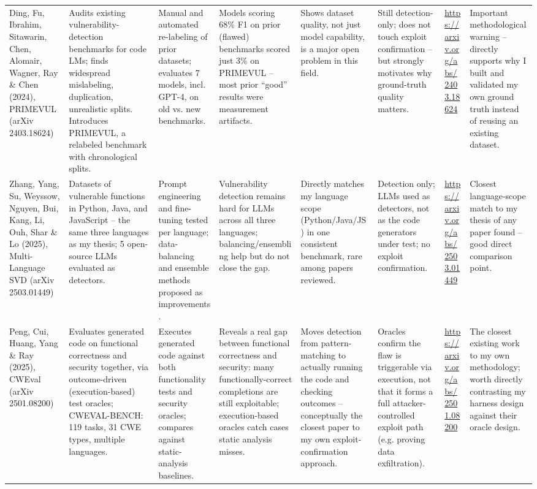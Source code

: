 \documentclass[10pt]{article}
\begin{document}
\begin{landscape}
\begin{longtable}{
  P{2.6cm}
  P{3.6cm}
  P{3.2cm}
  P{4.0cm}
  P{3.0cm}
  P{3.0cm}
  P{2.2cm}
  P{3.6cm}
}
Ding, Fu, Ibrahim, Sitawarin, Chen, Alomair, Wagner, Ray \& Chen (2024), PRIMEVUL (arXiv 2403.18624)
&
Audits existing vulnerability-detection benchmarks for code LMs; finds widespread mislabeling, duplication, unrealistic splits. Introduces PRIMEVUL, a relabeled benchmark with chronological splits.
&
Manual and automated re-labeling of prior datasets; evaluates 7 models, incl. GPT-4, on old vs. new benchmarks.
&
Models scoring 68\% F1 on prior (flawed) benchmarks scored just 3\% on PRIMEVUL -- most prior ``good'' results were measurement artifacts.
&
Shows dataset quality, not just model capability, is a major open problem in this field.
&
Still detection-only; does not touch exploit confirmation -- but strongly motivates why ground-truth quality matters.
&
\url{https://arxiv.org/abs/2403.18624}
&
Important methodological warning -- directly supports why I built and validated my own ground truth instead of reusing an existing dataset.
\\[4pt]

Zhang, Yang, Su, Weyssow, Nguyen, Bui, Kang, Li, Ouh, Shar \& Lo (2025), Multi-Language SVD (arXiv 2503.01449)
&
Datasets of vulnerable functions in Python, Java, and JavaScript -- the same three languages as my thesis; 5 open-source LLMs evaluated as detectors.
&
Prompt engineering and fine-tuning tested per language; data-balancing and ensemble methods proposed as improvements.
&
Vulnerability detection remains hard for LLMs across all three languages; balancing/ensembling help but do not close the gap.
&
Directly matches my language scope (Python/Java/JS) in one consistent benchmark, rare among papers reviewed.
&
Detection only; LLMs used as detectors, not as the code generators under test; no exploit confirmation.
&
\url{https://arxiv.org/abs/2503.01449}
&
Closest language-scope match to my thesis of any paper found -- good direct comparison point.
\\[4pt]

Peng, Cui, Huang, Yang \& Ray (2025), CWEval (arXiv 2501.08200)
&
Evaluates generated code on functional correctness and security together, via outcome-driven (execution-based) test oracles; CWEVAL-BENCH: 119 tasks, 31 CWE types, multiple languages.
&
Executes generated code against both functionality tests and security oracles; compares against static-analysis baselines.
&
Reveals a real gap between functional correctness and security: many functionally-correct completions are still exploitable; execution-based oracles catch cases static analysis misses.
&
Moves detection from pattern-matching to actually running the code and checking outcomes -- conceptually the closest paper to my own exploit-confirmation approach.
&
Oracles confirm the flaw is triggerable via execution, not that it forms a full attacker-controlled exploit path (e.g. proving data exfiltration).
&
\url{https://arxiv.org/abs/2501.08200}
&
The closest existing work to my own methodology; worth directly contrasting my harness design against their oracle design.
\\[4pt]


\end{longtable}
\end{landscape}
\end{document}
